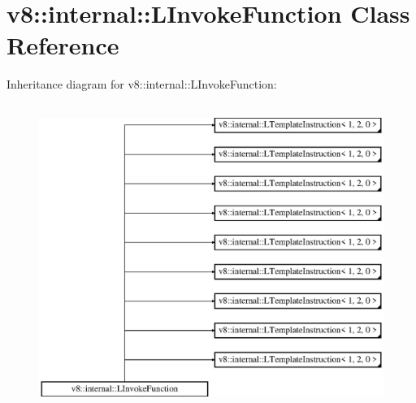 \hypertarget{classv8_1_1internal_1_1_l_invoke_function}{}\section{v8\+:\+:internal\+:\+:L\+Invoke\+Function Class Reference}
\label{classv8_1_1internal_1_1_l_invoke_function}
Inheritance diagram for v8\+:\+:internal\+:\+:L\+Invoke\+Function\+:\begin{figure}[H]
\begin{center}
\leavevmode
\includegraphics[height=10.000000cm]{classv8_1_1internal_1_1_l_invoke_function}
\end{center}
\end{figure}
